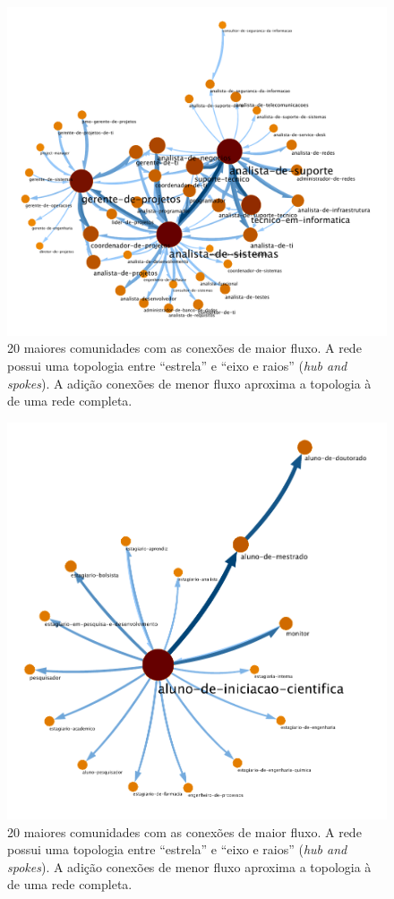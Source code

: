 \documentclass[
  article,
  11pt,
  a4paper,
  english,
  brazil,
  sumario=tradicional]{abntex2}
\begin{document}
\begin{figure}[h]
  \centering
  \includegraphics[width=0.7\linewidth]{ex-sobreposicao-analista-de-sistemas.pdf}
  \caption{20 maiores comunidades com as conexões de maior fluxo. A rede possui uma topologia entre \enquote{estrela} e \enquote{eixo e raios} (\textit{hub and spokes}). A adição conexões de menor fluxo aproxima a topologia à de uma rede completa.}
  \label{fig:ex-sobreposicao-ti}
\end{figure}

\begin{figure}[h]
  \centering
  \includegraphics[width=0.7\linewidth]{ex-sobreposicao-aluno-iniciacao.pdf}
  \caption{20 maiores comunidades com as conexões de maior fluxo. A rede possui uma topologia entre \enquote{estrela} e \enquote{eixo e raios} (\textit{hub and spokes}). A adição conexões de menor fluxo aproxima a topologia à de uma rede completa.}
  \label{fig:ex-sobreposicao-ciencia}
\end{figure}

\newpage


\end{document}

